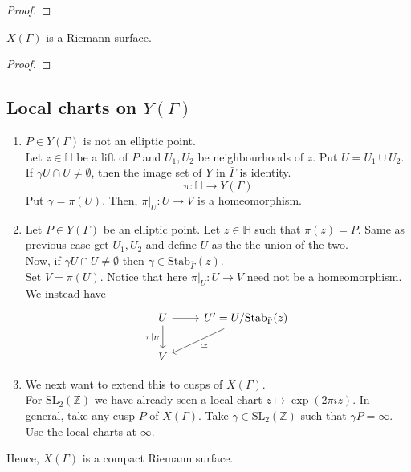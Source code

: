 \documentclass[oneside, 12pt]{scrbook}
\newcommand{\ZZ}{\mathbb Z}
\newcommand{\SL}{\mathrm{SL}}
\newcommand{\HH}{\mathbb{H}}
\newcommand{\Stab}{\mathrm{Stab}}
\theoremstyle{theorem}
\begin{document}
\begin{proof}

\end{proof}

\begin{theorem}
$X(\Gamma)$ is a Riemann surface.
\end{theorem}

\begin{proof}

\end{proof}

\subsection{Local charts on $Y(\Gamma)$}

\begin{enumerate}
\item $P \in Y(\Gamma)$ is not an elliptic point. \\

Let $z\in \HH$ be a lift of $P$ and $U_{1},U_{2}$ be neighbourhoods of $z$. Put $U=U_{1} \cup U_{2}$. If $\gamma U \cap U \neq \emptyset$, then the image set of $Y$ in $\bar{\Gamma}$ is identity. 
$$\pi : \HH \rightarrow Y(\Gamma)$$
Put $\gamma   = \pi (U)$. Then, $\pi|_{U} : U \rightarrow V$ is a homeomorphism. 

\item Let $P \in Y(\Gamma)$ be an elliptic point. Let $z\in \HH$ such that $\pi(z) = P$. Same as previous case get $U_{1},U_{2}$ and define $U$ as the the union of the two. \\
Now, if $\gamma U \cap U \neq \emptyset$ then $\gamma \in \Stab_{\bar{\Gamma}}(z)$. \\
Set $V= \pi (U)$. Notice that here $\pi|_{U}: U \rightarrow V$ need not be a homeomorphism. We instead have 
\[\begin{tikzcd}
	U & {U'=U/\mathrm{Stab}_{\bar{\Gamma}}(z)} \\
	V
	\arrow["{\pi|_{U} }"', from=1-1, to=2-1]
	\arrow[from=1-1, to=1-2]
	\arrow["\simeq", from=1-2, to=2-1]
\end{tikzcd}\]

\item We next want to extend this to cusps of $X(\Gamma)$. \\
For $\SL_{2}(\ZZ)$ we have already seen a local chart $z\mapsto \exp(2 \pi i z)$. In general, take any cusp $P$ of $X(\Gamma)$. Take $\gamma \in \SL_{2}(\ZZ)$ such that $\gamma P = \infty$. Use the local charts at $\infty$.
\end{enumerate}
Hence, $X(\Gamma)$ is a compact Riemann surface. \\
\end{document}

